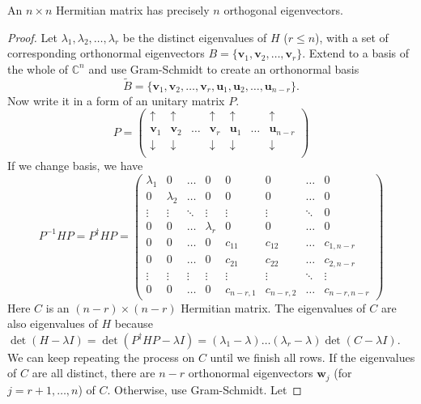 \documentclass[a4paper]{article}
\begin{document}
\begin{thm}
  An $n\times n$ Hermitian matrix has precisely $n$ orthogonal eigenvectors.
\end{thm}
\begin{proof} Let $\lambda_1,\lambda_2, \dots, \lambda_r$ be the distinct eigenvalues of $H$ ($r \leq n$), with a set of corresponding orthonormal eigenvectors $B = \{\mathbf{v}_1, \mathbf{v}_2, \dots, \mathbf{v}_r\}$. Extend to a basis of the whole of $\mathbb{C}^n$ and use Gram-Schmidt to create an orthonormal basis
  \[
    \tilde{B} = \{\mathbf{v}_1, \mathbf{v}_2, \dots, \mathbf{v}_r, \mathbf{u}_1, \mathbf{u}_2, \dots, \mathbf{u}_{n - r}\}.
  \]
  Now write it in a form of an unitary matrix $P$.
  \[
    P =
    \begin{pmatrix}
      \uparrow & \uparrow & & \uparrow & \uparrow & & \uparrow\\
      \mathbf{v}_1 & \mathbf{v}_2 & \dots & \mathbf{v}_r & \mathbf{u}_1 & \dots & \mathbf{u}_{n - r}\\
      \downarrow & \downarrow & & \downarrow & \downarrow & & \downarrow\\
    \end{pmatrix}
  \]
  If we change basis, we have
  $$P^{-1}HP = P^\dagger HP= \begin{pmatrix}
      \lambda_1 & 0 & \dots & 0 & 0 & 0 & \dots & 0\\
      0 & \lambda_2 & \dots & 0 & 0 & 0 & \dots & 0\\
      \vdots & \vdots & \ddots & \vdots & \vdots & \vdots & \ddots & 0\\
      0 & 0 & \dots & \lambda_r & 0 & 0 & \dots & 0\\
      0 & 0 & \dots & 0 & c_{11} & c_{12} & \dots & c_{1, n - r}\\
      0 & 0 & \dots & 0 & c_{21} & c_{22} & \dots & c_{2, n - r}\\
      \vdots & \vdots & \vdots & \vdots & \vdots & \vdots & \ddots & \vdots \\
      0 & 0 & \dots & 0 & c_{n - r,1} & c_{n - r,2} & \dots & c_{n - r, n - r}
    \end{pmatrix}$$
  Here $C$ is an $(n - r)\times (n - r)$ Hermitian matrix. The eigenvalues of $C$ are also eigenvalues of $H$ because $\det (H - \lambda I) = \det(P^\dagger HP - \lambda I) = (\lambda_1 - \lambda)\dots (\lambda_r - \lambda)\det (C - \lambda I)$. We can keep repeating the process on $C$ until we finish all rows. If the eigenvalues of $C$ are all distinct, there are $n - r$ orthonormal eigenvectors $\mathbf{w}_j$ (for $j = r + 1, \dots, n$) of $C$. Otherwise, use Gram-Schmidt. Let

\end{proof}
\end{document}
